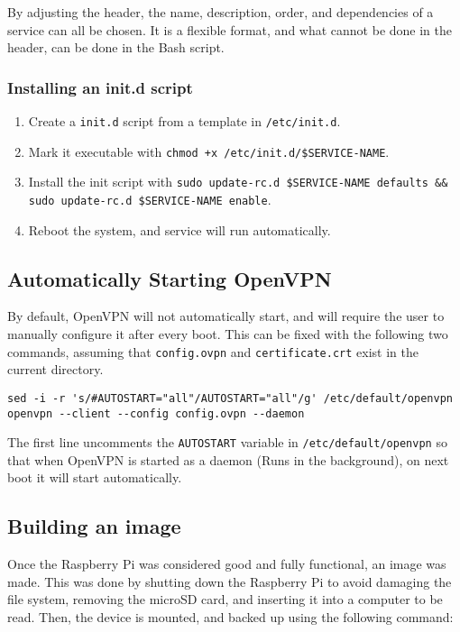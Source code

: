 By adjusting the header, the name, description, order, and dependencies of a service can all be chosen. It is a flexible format, and what cannot be done in the header, can be done in the Bash script.

\subsubsection{Installing an init.d script}

\begin{enumerate}
\item Create a \lstinline{init.d} script from a template in \lstinline{/etc/init.d}.
\item Mark it executable with \lstinline{chmod +x /etc/init.d/$SERVICE-NAME}.
\item Install the init script with \lstinline{sudo update-rc.d $SERVICE-NAME defaults && sudo update-rc.d $SERVICE-NAME enable}.
\item Reboot the system, and service will run automatically.
\end{enumerate}

\subsection{Automatically Starting OpenVPN}

By default, OpenVPN will not automatically start, and will require the user to manually configure it after every boot. This can be fixed with the following two commands, assuming that \lstinline{config.ovpn} and \lstinline{certificate.crt} exist in the current directory.\\

\begin{lstlisting}[caption={Configuring OpenVPN}, label={lst:configuring-openvpn}]
sed -i -r 's/#AUTOSTART="all"/AUTOSTART="all"/g' /etc/default/openvpn
openvpn --client --config config.ovpn --daemon
\end{lstlisting}

The first line uncomments the \lstinline{AUTOSTART} variable in \lstinline{/etc/default/openvpn} so that when OpenVPN is started as a daemon (Runs in the background), on next boot it will start automatically.

\subsection{Building an image}

Once the Raspberry Pi was considered good and fully functional, an image was made. This was done by shutting down the Raspberry Pi to avoid damaging the file system, removing the microSD card, and inserting it into a computer to be read. Then, the device is mounted, and backed up using the following command:\\

